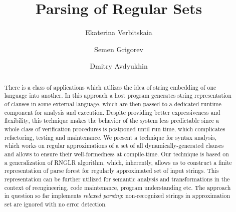 \documentclass{llncs}
\begin{document}
\frontmatter          %

\pagestyle{headings}  %

\title{Parsing of Regular Sets}


\author{Ekaterina Verbitskaia \and Semen Grigorev
\and Dmitry Avdyukhin}
%
%


\maketitle              %

\begin{abstract}

There is a class of applications which utilizes the idea of string embedding of one language into
another. In this approach a host program generates string representation of clauses in some external
language, which are then passed to a dedicated runtime component
for analysis and execution. Despite providing better expressiveness and flexibility, this technique
makes the behavior of the system less predictable since a whole class of verification procedures
is postponed until run time, which complicates refactoring, testing and maintenance. We present a
technique for syntax analysis, which works on regular approximations of a set of all dynamically-generated clauses
and allows to ensure their well-formedness at compile-time. Our technique is based on a generalization of RNGLR
algorithm, which, inherently, allows us to construct a finite representation of parse forest for regularly approximated
set of input strings. This representation can be further utilized for semantic analysis and transformations in the context
of reengineering, code maintenance, program understanding etc. The approach in question so far implements
\emph{relaxed parsing}: non-recognized strings in approximation set are ignored with no error detection.
\end{abstract}
\end{document}
